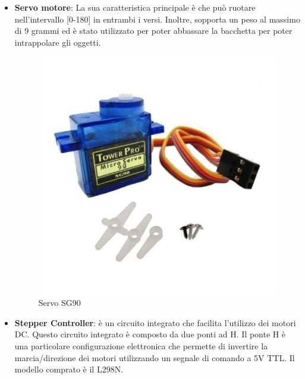 \documentclass[a4paper,12pt,italian]{article}
\begin{document}
\begin{itemize}
	\item \textbf{Servo motore}: La sua caratteristica principale è che può ruotare nell’intervallo [0-180] in entrambi i versi. Inoltre, sopporta un peso al massimo di 9 grammi ed è stato utilizzato per poter abbassare la bacchetta per poter intrappolare gli oggetti.
 		\begin{figure}[H]
			\begin{center}
			\includegraphics[scale=0.1]{servo}
			\caption{Servo SG90}
			\label{Fig: servo}
			\end{center}
		\end{figure}
	\item \textbf{Stepper Controller}: è un circuito integrato che facilita l'utilizzo dei motori DC. Questo circuito integrato è composto da due ponti ad H. Il ponte H è una particolare configurazione elettronica che permette di invertire la marcia/direzione dei motori utilizzando un segnale di comando a 5V TTL. Il modello comprato è il L298N.
		\begin{figure}[H]
			\begin{center}

\end{center}
\end{figure}
\end{itemize}
\end{document}
